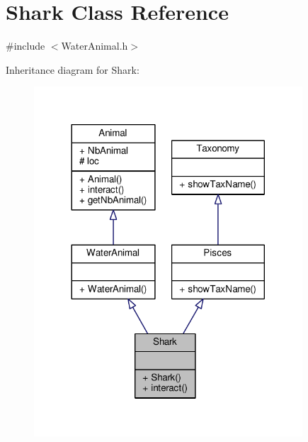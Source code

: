 \hypertarget{classShark}{}\section{Shark Class Reference}
\label{classShark}


{\ttfamily \#include $<$Water\+Animal.\+h$>$}



Inheritance diagram for Shark\+:
\nopagebreak
\begin{figure}[H]
\begin{center}
\leavevmode
\includegraphics[width=284pt]{classShark__inherit__graph}
\end{center}
\end{figure}


